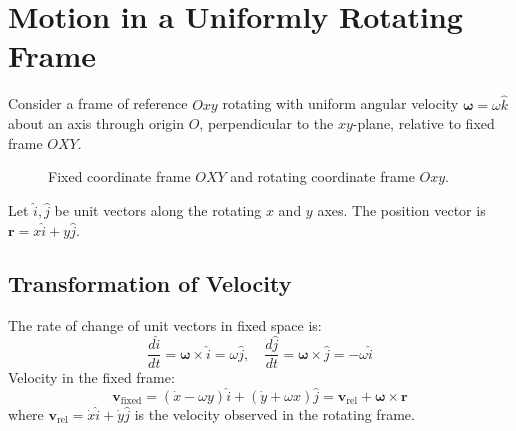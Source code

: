 \section{Motion in a Uniformly Rotating Frame}

Consider a frame of reference $Oxy$ rotating with uniform angular velocity $\mathbf{\omega} = \omega \hat{k}$ about an axis through origin $O$, perpendicular to the $xy$-plane, relative to fixed frame $OXY$.

\begin{figure}[htbp]
\centering
{}
\caption{Fixed coordinate frame $OXY$ and rotating coordinate frame $Oxy$.}
\end{figure}

Let $\hat{i}, \hat{j}$ be unit vectors along the rotating $x$ and $y$ axes. The position vector is $\mathbf{r} = x \hat{i} + y \hat{j}$.

\subsection{Transformation of Velocity}
The rate of change of unit vectors in fixed space is:
\begin{equation}
    \frac{d\hat{i}}{dt} = \mathbf{\omega} \times \hat{i} = \omega \hat{j}, \quad \frac{d\hat{j}}{dt} = \mathbf{\omega} \times \hat{j} = -\omega \hat{i}
\end{equation}
Velocity in the fixed frame:
\begin{equation}
    \mathbf{v}_{\text{fixed}} = \left( \dot{x} - \omega y \right) \hat{i} + \left( \dot{y} + \omega x \right) \hat{j} = \mathbf{v}_{\text{rel}} + \mathbf{\omega} \times \mathbf{r}
\end{equation}
where $\mathbf{v}_{\text{rel}} = \dot{x}\hat{i} + \dot{y}\hat{j}$ is the velocity observed in the rotating frame.


